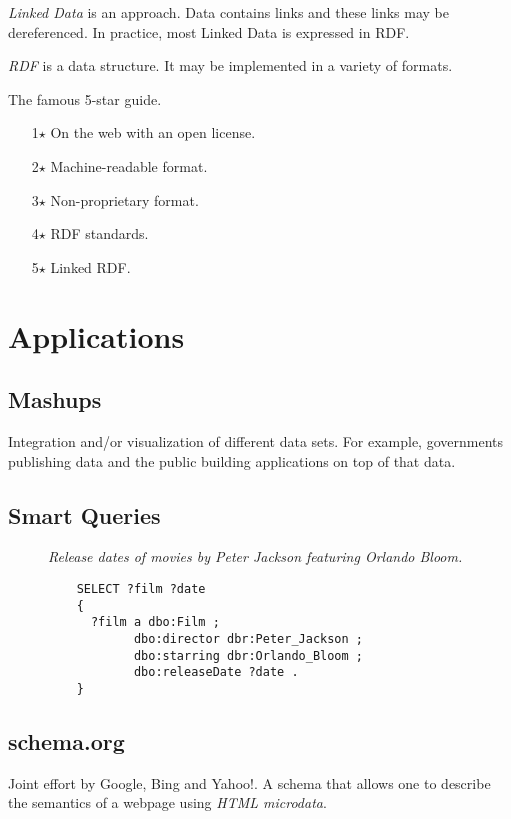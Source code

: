 \documentclass{report}
\begin{document}
\emph{Linked Data} is an approach.
Data contains links
and these links may be dereferenced.
In practice, most Linked Data is expressed in RDF.

\emph{RDF} is a data structure.
It may be implemented in a variety of formats.

The famous 5-star guide.
\begin{enumerate}
  \item[1$\star$] On the web with an open license.
  \item[2$\star$] Machine-readable format. 
  \item[3$\star$] Non-proprietary format.
  \item[4$\star$] RDF standards.
  \item[5$\star$] Linked RDF.
\end{enumerate}

\section{Applications}

\subsection{Mashups}

Integration and/or visualization of different data sets.
For example, governments publishing data
and the public building applications on top of that data.

\subsection{Smart Queries}

\begin{figure}[H]
  \textit{
    Release dates
    of movies
    by Peter Jackson
    featuring Orlando Bloom.
  }

  \begin{lstlisting}
    SELECT ?film ?date
    { 
      ?film a dbo:Film ;
            dbo:director dbr:Peter_Jackson ;
            dbo:starring dbr:Orlando_Bloom ;
            dbo:releaseDate ?date .
    }
  \end{lstlisting}
\end{figure}

\subsection{schema.org}

Joint effort by Google, Bing and Yahoo!.
A schema that allows one to describe
the semantics of a webpage using \emph{HTML microdata}.
\end{document}
